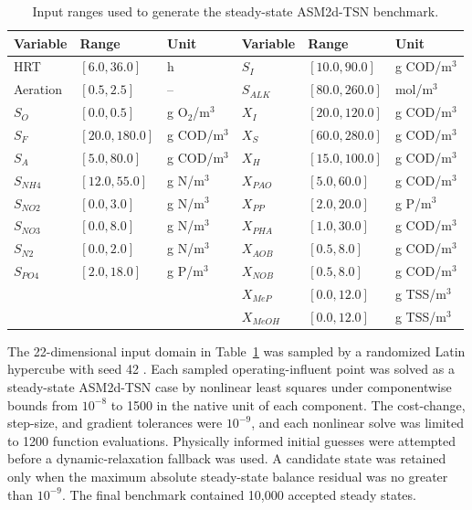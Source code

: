 \documentclass[12pt, twoside]{book}
\begin{document}
\begin{table}[htbp]
\centering
\caption{Input ranges used to generate the steady-state ASM2d-TSN benchmark.}
\label{tab:ch3_simulation_domain}
\scriptsize
\setlength{\tabcolsep}{4pt}
\begin{tabular}{lll|lll}
\toprule
Variable & Range & Unit & Variable & Range & Unit \\
\midrule
HRT & \([6.0,36.0]\) & h & \(S_I\) & \([10.0,90.0]\) & g COD/m\(^3\) \\
Aeration & \([0.5,2.5]\) & -- & \(S_{ALK}\) & \([80.0,260.0]\) & mol/m\(^3\) \\
\(S_O\) & \([0.0,0.5]\) & g O\(_2\)/m\(^3\) & \(X_I\) & \([20.0,120.0]\) & g COD/m\(^3\) \\
\(S_F\) & \([20.0,180.0]\) & g COD/m\(^3\) & \(X_S\) & \([60.0,280.0]\) & g COD/m\(^3\) \\
\(S_A\) & \([5.0,80.0]\) & g COD/m\(^3\) & \(X_H\) & \([15.0,100.0]\) & g COD/m\(^3\) \\
\(S_{NH4}\) & \([12.0,55.0]\) & g N/m\(^3\) & \(X_{PAO}\) & \([5.0,60.0]\) & g COD/m\(^3\) \\
\(S_{NO2}\) & \([0.0,3.0]\) & g N/m\(^3\) & \(X_{PP}\) & \([2.0,20.0]\) & g P/m\(^3\) \\
\(S_{NO3}\) & \([0.0,8.0]\) & g N/m\(^3\) & \(X_{PHA}\) & \([1.0,30.0]\) & g COD/m\(^3\) \\
\(S_{N2}\) & \([0.0,2.0]\) & g N/m\(^3\) & \(X_{AOB}\) & \([0.5,8.0]\) & g COD/m\(^3\) \\
\(S_{PO4}\) & \([2.0,18.0]\) & g P/m\(^3\) & \(X_{NOB}\) & \([0.5,8.0]\) & g COD/m\(^3\) \\
 & & & \(X_{MeP}\) & \([0.0,12.0]\) & g TSS/m\(^3\) \\
 & & & \(X_{MeOH}\) & \([0.0,12.0]\) & g TSS/m\(^3\) \\
\bottomrule
\end{tabular}
\end{table}

The 22-dimensional input domain in Table~\ref{tab:ch3_simulation_domain} was sampled by a randomized Latin
hypercube with seed 42 \citep{McKay1979}. Each sampled operating-influent point was solved as a steady-state
ASM2d-TSN case by nonlinear least squares under componentwise bounds from \(10^{-8}\) to 1500 in the native
unit of each component. The cost-change, step-size, and gradient tolerances were \(10^{-9}\), and each
nonlinear solve was limited to 1200 function evaluations. Physically informed initial guesses were attempted
before a dynamic-relaxation fallback was used. A candidate state was retained only when the maximum absolute
steady-state balance residual was no greater than \(10^{-9}\). The final benchmark contained 10,000 accepted
steady states.
\end{document}
